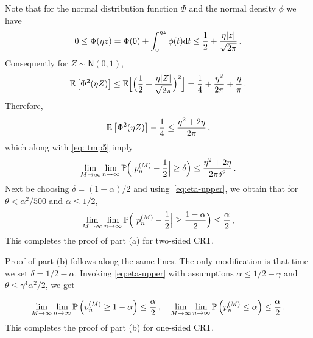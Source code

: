 \documentclass[11pt]{article}
\def\normal{\mathsf{N}}
\begin{document}
Note that for the normal distribution function $\Phi$ and the normal density $\phi$ we have %
 \[
0\leq  \Phi(\eta z)= \Phi(0)+ \int_{0}^{\eta z} \phi(t){\rm d} t \le \frac{1}{2}+ \frac{\eta |z|}{\sqrt{2\pi}} \,.
 \]
Consequently for $Z\sim\normal(0,1)$,
\[
{\mathbb E}\left[\Phi^2(\eta Z)\right] \leq {\mathbb E}\Big[ \Big(\frac{1}{2}+\frac{\eta |Z|}{\sqrt{2\pi}}\Big)^2\Big] = \frac{1}{4}+\frac{\eta^2}{2\pi} + \frac{\eta}{\pi}\,.
\]
Therefore,
\[
{\mathbb E}\left[\Phi^2(\eta Z)\right] - \frac{1}{4} \leq \frac{\eta^2+2\eta}{2\pi}\,,
\]
which along with \eqref{eq: tmp5} imply
%
\[
\lim\limits_{M\rightarrow \infty}^{} \lim\limits_{n\rightarrow \infty}^{}{\mathbb P}\Big(  \Big|p_{n}^{(M)}  -\frac{1}{2} \Big|   \geq \delta\Big) \leq \frac{\eta^2+2\eta}{2\pi\delta^2}\,.
\]
Next be choosing $\delta=(1-\alpha)/2$ and using~\eqref{eq:eta-upper}, we obtain that for $\theta<\alpha^2/500$ and $\alpha\le 1/2$,
%
\[
\lim\limits_{M\rightarrow \infty}^{} \lim\limits_{n\rightarrow \infty}^{}{\mathbb P}\Big(  \Big|p_{n}^{(M)}  -\frac{1}{2} \Big|   \geq  \frac{1-\alpha}{2} \Big)\leq  \frac{\alpha}{2}\,,
\]
This completes the proof of part (a) for two-sided CRT. 

Proof of part (b) follows along the same lines. The only modification is that time we set $\delta = 1/2-\alpha$. Invoking \eqref{eq:eta-upper} with assumptions $\alpha \le 1/2-\gamma$ and $\theta\leq \gamma^4\alpha^2/2$, we get 

\begin{align*}
\lim\limits_{M\rightarrow \infty}^{} \lim\limits_{n\rightarrow \infty}^{}{\mathbb P}\left(  p_{n}^{(M)}   \geq  1-\alpha \right) \leq \frac{\alpha}{2}\,,\quad
\lim\limits_{M\rightarrow \infty}^{} \lim\limits_{n\rightarrow \infty}^{}{\mathbb P}\left(  p_{n}^{(M)}   \leq  \alpha \right) \leq \frac{\alpha}{2}\,.
\end{align*}
%
This completes the proof of part (b) for one-sided CRT. 
\end{document}
